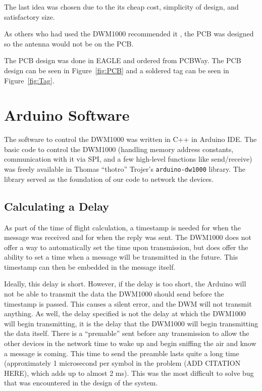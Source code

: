 The last idea was chosen due to the its cheap cost, simplicity of design, and satisfactory size. 

As others who had used the DWM1000 recommended it \cite{LPSMini}, the PCB was designed so the antenna would not be on the PCB.

The PCB design was done in EAGLE and ordered from PCBWay. The PCB design can be seen in Figure~\ref{fig:PCB} and a soldered tag can be seen in Figure~\ref{fig:Tag}.

\section{Arduino Software}
The software to control the DWM1000 was written in C++ in Arduino IDE. The basic code to control the DWM1000 (handling memory address constants, communication with it via SPI, and a few high-level functions like send/receive) was freely available in Thomas ``thotro'' Trojer's \texttt{arduino-dw1000} library. The library served as the foundation of our code to network the devices.

\subsection{Calculating a Delay}
\label{CalculatingADelay}
As part of the time of flight calculation, a timestamp is needed for when the message was received and for when the reply was sent. The DWM1000 does not offer a way to automatically set the time upon transmission, but does offer the ability to set a time when a message will be transmitted in the future. This timestamp can then be embedded in the message itself.

Ideally, this delay is short. However, if the delay is too short, the Arduino will not be able to transmit the data the DWM1000 should send before the timestamp is passed. This causes a silent error, and the DWM will not transmit anything. As well, the delay specified is not the delay at which the DWM1000 will begin transmitting, it is the delay that the DWM1000 will begin transmitting the data itself. There is a ``premable'' sent before any transmission to allow the other devices in the network time to wake up and begin sniffing the air and know a message is coming. This time to send the preamble lasts quite a long time (approximately 1 microsecond per symbol in the problem (ADD CITATION HERE), which adds up to almost 2 ms). This was the most difficult to solve bug that was encountered in the design of the system.

